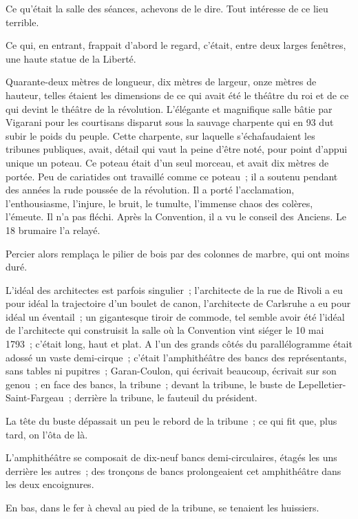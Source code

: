 \documentclass[french,twoside]{book} %
\begin{document}
\noindent Ce qu’était la salle des séances, achevons de le dire. Tout intéresse de ce lieu terrible.\par
 Ce qui, en entrant, frappait d’abord le regard, c’était, entre deux larges fenêtres, une haute statue de la Liberté.\par
Quarante-deux mètres de longueur, dix mètres de largeur, onze mètres de hauteur, telles étaient les dimensions de ce qui avait été le théâtre du roi et de ce qui devint le théâtre de la révolution. L’élégante et magnifique salle bâtie par Vigarani pour les courtisans disparut sous la sauvage charpente qui en 93 dut subir le poids du peuple. Cette charpente, sur laquelle s’échafaudaient les tribunes publiques, avait, détail qui vaut la peine d’être noté, pour point d’appui unique un poteau. Ce poteau était d’un seul morceau, et avait dix mètres de portée. Peu de cariatides ont travaillé comme ce poteau ; il a soutenu pendant des années la rude poussée de la révolution. Il a porté l’acclamation, l’enthousiasme, l’injure, le bruit, le tumulte, l’immense chaos des colères, l’émeute. Il n’a pas fléchi. Après la Convention, il a vu le conseil des Anciens. Le 18 brumaire l’a relayé.\par
Percier alors remplaça le pilier de bois par des colonnes de marbre, qui ont moins duré.\par
L’idéal des architectes est parfois singulier ; l’architecte de la rue de Rivoli a eu pour idéal la trajectoire d’un boulet de canon, l’architecte de Carlsruhe a eu pour idéal un éventail ; un gigantesque tiroir de commode, tel semble avoir été l’idéal de l’architecte qui construisit la salle où la Convention vint siéger le 10 mai 1793 ; c’était long, haut et plat. A l’un des grands côtés du parallélogramme était adossé un  vaste demi-cirque ; c’était l’amphithéâtre des bancs des représentants, sans tables ni pupitres ; Garan-Coulon, qui écrivait beaucoup, écrivait sur son genou ; en face des bancs, la tribune ; devant la tribune, le buste de Lepelletier-Saint-Fargeau ; derrière la tribune, le fauteuil du président.\par
La tête du buste dépassait un peu le rebord de la tribune ; ce qui fit que, plus tard, on l’ôta de là.\par
L’amphithéâtre se composait de dix-neuf bancs demi-circulaires, étagés les uns derrière les autres ; des tronçons de bancs prolongeaient cet amphithéâtre dans les deux encoignures.\par
En bas, dans le fer à cheval au pied de la tribune, se tenaient les huissiers.\par
\end{document}
